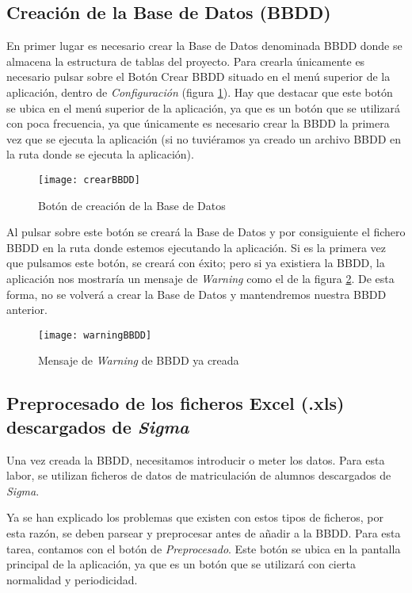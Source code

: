 \subsection{Creación de la Base de Datos (BBDD)}

En primer lugar es necesario crear la Base de Datos denominada BBDD donde se almacena la estructura de tablas del proyecto.
Para crearla únicamente es necesario pulsar sobre el Botón {Crear BBDD} situado en el menú superior de la aplicación, dentro de \emph{Configuración} (figura \ref{fig:crearBBDD}). Hay que destacar que este botón se ubica en el menú superior de la aplicación, ya que es un botón que se utilizará con poca frecuencia, ya que únicamente es necesario crear la BBDD la primera vez que se ejecuta la aplicación (si no tuviéramos ya creado un archivo BBDD en la ruta donde se ejecuta la aplicación). 

\begin{figure}%
		\centering
		\texttt{[image: crearBBDD]}
		\caption{Botón de creación de la Base de Datos}\label{fig:crearBBDD}
	\end{figure}


Al pulsar sobre este botón se creará la Base de Datos y por consiguiente el fichero BBDD en la ruta donde estemos ejecutando la aplicación.
Si es la primera vez que pulsamos este botón, se creará con éxito; pero si ya existiera la BBDD, la aplicación nos mostraría un mensaje de \emph{Warning} como el de la figura \ref{fig:warningBBDD}. De esta forma, no se volverá a crear la Base de Datos y mantendremos nuestra BBDD anterior.

\begin{figure}%
		\centering
		\texttt{[image: warningBBDD]}
		\caption{Mensaje de \emph{Warning} de BBDD ya creada}\label{fig:warningBBDD}
	\end{figure}



\subsection{Preprocesado de los ficheros Excel (.xls) descargados de \emph{Sigma}}

Una vez creada la BBDD, necesitamos introducir o meter los datos. Para esta labor, se utilizan ficheros de datos de matriculación de alumnos descargados de \emph{Sigma}.

Ya se han explicado los problemas que existen con estos tipos de ficheros, por esta razón, se deben parsear y preprocesar antes de añadir a la BBDD. Para esta tarea, contamos con el botón de \emph{Preprocesado}. Este botón se ubica en la pantalla principal de la aplicación, ya que es un botón que se utilizará con cierta normalidad y periodicidad. 

